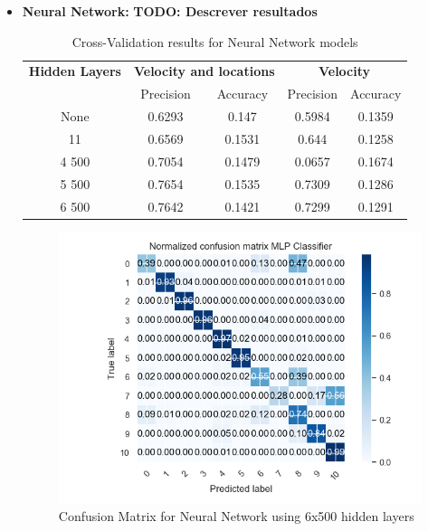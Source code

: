 \begin{itemize}
\newpage
\item \textbf{Neural Network: }
\textbf{TODO: Descrever resultados}
\begin {table}[H]
\begin{center}
\begin{tabular}{c|c|c|c|c}
\multicolumn{1}{c|}{\textbf{Hidden Layers } }   &\multicolumn{2}{c|}{\textbf{ Velocity and locations}}& \multicolumn{2}{c}{\textbf{ Velocity}}\\
&Precision & Accuracy & Precision & Accuracy \\
\hline
None &0.6293&0.147   &0.5984 &0.1359\\
11   & 0.6569&0.1531   &0.644 &0.1258\\
4 500 &0.7054&0.1479  & 0.0657 & 0.1674\\
5 500 & 0.7654&0.1535 &0.7309 & 0.1286\\
6 500 &0.7642 &0.1421 &0.7299 &0.1291 
\label{table:cross_val_nn}
\end{tabular}
\caption {Cross-Validation results for Neural Network models}
\end{center}
\end {table}


\begin{figure}[h]
    \centering
    \includegraphics[width=0.8\linewidth]{Chapters/img/CM_NN.png}
    \caption{Confusion Matrix for Neural Network using 6x500 hidden layers}
    \label{fig:cm_nn}
\end{figure}



\end{itemize}
